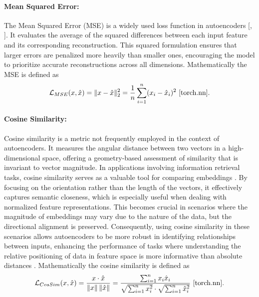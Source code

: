\paragraph{Mean Squared Error:} The Mean Squared Error (MSE) is a widely used loss function in autoencoders [\cite{Berahmand24}, \cite{Charte18}]. It evaluates the average of the squared differences between each input feature and its corresponding reconstruction. This squared formulation ensures that larger errors are penalized more heavily than smaller ones, encouraging the model to prioritize accurate reconstructions across all dimensions. Mathematically the MSE is defined as
\[
\mathcal{L}_{MSE}(x, \hat{x}) = \|x - \hat{x}\|^2_2 = \frac{1}{n}\sum_{i=1}^{n} (x_i - \hat{x}_i)^2 \ \cite{torch.nn}.
\]

\paragraph{Cosine Similarity:} Cosine similarity is a metric not frequently employed in the context of autoencoders. It measures the angular distance between two vectors in a high-dimensional space, offering a geometry-based assessment of similarity that is invariant to vector magnitude. In applications involving information retrieval tasks, cosine similarity serves as a valuable tool for comparing embeddings \cite{Xia15}. By focusing on the orientation rather than the length of the vectors, it effectively captures semantic closeness, which is especially useful when dealing with normalized feature representations. This becomes crucial in scenarios where the magnitude of embeddings may vary due to the nature of the data, but the directional alignment is preserved. Consequently, using cosine similarity in these scenarios allows autoencoders to be more robust in identifying relationships between inputs, enhancing the performance of tasks where understanding the relative positioning of data in feature space is more informative than absolute distances \cite{Zhang23}. Mathematically the cosine similarity is defined as
\[
\mathcal{L}_{CosSim}(x, \hat{x}) = \frac{x \cdot \hat{x}}{\|x\| \, \|\hat{x}\|} = \frac{\sum_{i=1}^{n} x_i \hat{x}_i}{\sqrt{\sum_{i=1}^{n} x_i^2} \cdot \sqrt{\sum_{i=1}^{n} \hat{x}_i^2}} \ \cite{torch.nn}.
\]

